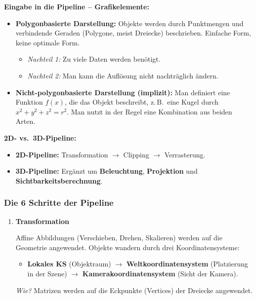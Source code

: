 \documentclass[12pt, a4paper]{article}
\begin{document}
\textbf{Eingabe in die Pipeline -- Grafikelemente:}
\begin{itemize}
  \item \textbf{Polygonbasierte Darstellung:} Objekte werden durch Punktmengen und verbindende Geraden (Polygone, meist Dreiecke) beschrieben. Einfache Form, keine optimale Form.
    \begin{itemize}
      \item \textit{Nachteil 1:} Zu viele Daten werden benötigt.
      \item \textit{Nachteil 2:} Man kann die Auflösung nicht nachträglich ändern.
    \end{itemize}
  \item \textbf{Nicht-polygonbasierte Darstellung (implizit):} Man definiert eine Funktion $f(x)$, die das Objekt beschreibt, z.\,B.\ eine Kugel durch $x^2+y^2+z^2=r^2$. Man nutzt in der Regel eine Kombination aus beiden Arten.
\end{itemize}

\textbf{2D- vs.\ 3D-Pipeline:}
\begin{itemize}
  \item \textbf{2D-Pipeline:} Transformation $\to$ Clipping $\to$ Verrasterung.
  \item \textbf{3D-Pipeline:} Ergänzt um \textbf{Beleuchtung}, \textbf{Projektion} und \textbf{Sichtbarkeitsberechnung}.
\end{itemize}

\subsubsection*{Die 6 Schritte der Pipeline}

\begin{enumerate}

  \item \textbf{Transformation}

  Affine Abbildungen (Verschieben, Drehen, Skalieren) werden auf die Geometrie angewendet. Objekte wandern durch drei Koordinatensysteme:
  \begin{itemize}
    \item \textbf{Lokales KS} (Objektraum) $\to$ \textbf{Weltkoordinatensystem} (Platzierung in der Szene) $\to$ \textbf{Kamerakoordinatensystem} (Sicht der Kamera).
  \end{itemize}
  \textit{Wie?} Matrizen werden auf die Eckpunkte (Vertices) der Dreiecke angewendet.

\end{enumerate}
\end{document}
